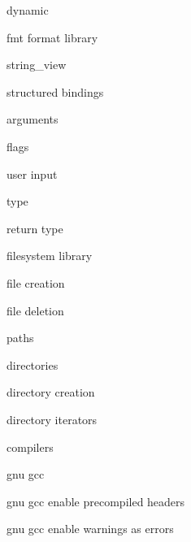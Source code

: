          dynamic 
        
         fmt format library
          
         string_view
        
         structured bindings
        
         arguments 
        
         flags 
        
         user input 
        
         type 
        
         return type 
        
         filesystem library
         
         file creation 
        
         file deletion 
        
         paths 
        
         directories

         directory creation
        
         directory iterators 
        
         compilers 
        
         gnu gcc
        
         gnu gcc enable precompiled headers
        
         gnu gcc enable warnings as errors
        
